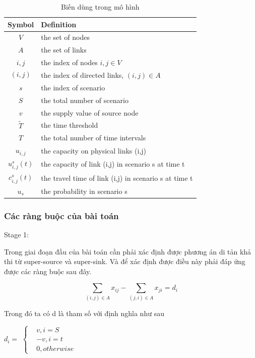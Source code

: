 \documentclass[a4paper]{article}
\begin{document}
\begin{center}
\begin{table}[ht!]
  \centering
  \caption{Biến dùng trong mô hình}
\begin{tabular}{cl}
\hline
  Symbol & Definition \\
   \hline
  $V$ & the set of nodes \\
 $A$  & the set of links  \\
   $i,j$ &the index of nodes $i,j \in V$ \\
   $$(i,j)$$ & the index of directed links, $(i,j) \in A$ \\
   $s$& the index of scenario \\
   $S$& the total number of scenario \\
   $v$ & the supply value of source node \\ 
   $\tilde{T}$& the time threshold\\
   $T$ & the total number of  time intervals\\
   $u_{i,j}$ & the capacity on physical links (i,j)\\
   $u_{i,j}^s (t)$ & the capacity of link (i,j) in scenario s at time t\\
   $c_{i,j}^s (t)$ &  the travel time of link (i,j) in scenario s at time t\\
   $u_s$& the probability in scenario s\\
   \hline 
\end{tabular}
\end{table}
\end{center}


\subsubsection{Các ràng buộc của bài toán}
Stage 1:

Trong giai đoạn đầu của bài toán cần phải xác định được phương án di tản khả thi từ super-source và super-sink. Và để xác định được điều này phải đáp ứng được các ràng buộc sau đây. 

\[ \sum_{(i,j)\in A }  x_{ij} -\sum_{(j,i) \in A} x_{ji} = d_i\]

Trong đó ta có d là tham số với định nghĩa như sau
\begin{center}
$d_i=$
$\begin{cases}
&v , i=S \\
& -v, i=t\\
&0, otherwise
\end{cases}$
\end{center}
\end{document}
